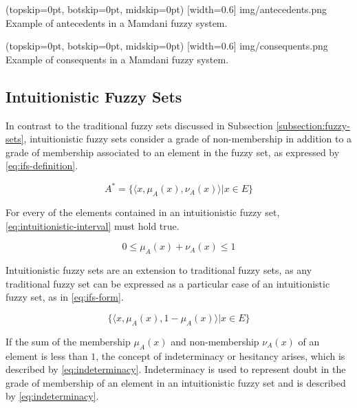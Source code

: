 \documentclass{ieeeaccess}
\begin{document}
\Figure[](topskip=0pt, botskip=0pt, midskip=0pt)
[width=0.6\linewidth]
{img/antecedents.png}
{Example of antecedents in a Mamdani fuzzy system.
  \label{figure:antecedents}}

\Figure[](topskip=0pt, botskip=0pt, midskip=0pt)
[width=0.6\linewidth]
{img/consequents.png}
{Example of consequents in a Mamdani fuzzy system.
  \label{figure:consequents}}

\subsection{Intuitionistic Fuzzy Sets}
\label{subsection:intuitionistic-fuzzy-sets}

In contrast to the traditional fuzzy sets discussed in Subsection
\ref{subsection:fuzzy-sets}, intuitionistic fuzzy sets consider a grade of
non-membership in addition to a grade of membership associated to an element in
the fuzzy set, as expressed by \ref{eq:ifs-definition}.

\begin{equation}
  \label{eq:ifs-definition}
  A^{*} = \{\langle x, \mu _{A} (x), \nu _{A} (x) \rangle | x \in E\}
\end{equation}

For every of the elements contained in an intuitionistic fuzzy set,
\ref{eq:intuitionistic-interval} must hold true.

\begin{equation}
  \label{eq:intuitionistic-interval}
  0 \leq \mu_{A}(x) + \nu_{A}(x) \leq 1
\end{equation}

Intuitionistic fuzzy sets are an extension to traditional fuzzy sets, as any
traditional fuzzy set can be expressed as a particular case of an intuitionistic
fuzzy set, as in \ref{eq:ifs-form}.

\begin{equation}
  \label{eq:ifs-form}
  \{ \langle x, \mu_{A}(x), 1 - \mu_{A}(x) \rangle | x \in E \}
\end{equation}

If the sum of the membership $\mu_{A}(x)$ and non-membership $\nu_{A}(x)$ of an
element is less than $1$, the concept of indeterminacy or hesitancy arises,
which is described by \ref{eq:indeterminacy}. Indeterminacy is used to represent
doubt in the grade of membership of an element in an intuitionistic fuzzy set
and is described by \ref{eq:indeterminacy}.
\end{document}
